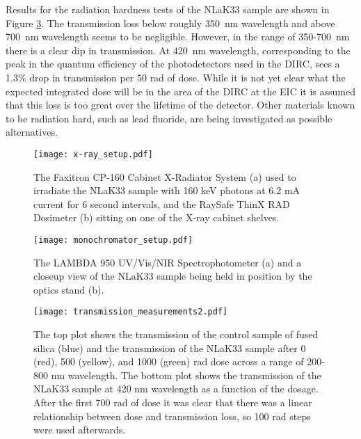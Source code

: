 Results for the radiation hardness tests of the NLaK33 sample are shown in Figure \ref{fig:transmission_measurements}. The transmission loss below roughly 350~nm wavelength and above 700~nm wavelength seems to be negligible. However, in the range of 350-700~nm there is a clear dip in transmission. At 420~nm wavelength, corresponding to the peak in the quantum efficiency of the photodetectors used in the DIRC, sees a 1.3\% drop in transmission per 50 rad of dose. While it is not yet clear what the expected integrated dose will be in the area of the DIRC at the EIC it is assumed that this loss is too great over the lifetime of the detector. Other materials known to be radiation hard, such as lead fluoride, are being investigated as possible alternatives.

\begin{figure}[!htb]
	\centering
	\texttt{[image: x-ray\_setup.pdf]}
	\caption{The Faxitron CP-160 Cabinet X-Radiator System (a) used to irradiate the NLaK33 sample with 160 keV photons at 6.2 mA current for 6 second intervals, and the RaySafe ThinX RAD Dosimeter (b) sitting on one of the X-ray cabinet shelves.}
	\label{fig:x-ray_setup}
\end{figure}


\begin{figure}[!htb]
	\centering
	\texttt{[image: monochromator\_setup.pdf]}
	\caption{The LAMBDA 950 UV/Vis/NIR Spectrophotometer (a) and a closeup view of the NLaK33 sample being held in position by the optics stand (b).}
	\label{fig:monochromator_setup}
\end{figure}

\begin{figure}[!htb]
	\centering
	\texttt{[image: transmission\_measurements2.pdf]}
	\caption{The top plot shows the transmission of the control sample of fused silica (blue) and the transmission of the NLaK33 sample after 0 (red), 500 (yellow), and 1000 (green) rad dose across a range of 200-800 nm wavelength. The bottom plot shows the transmission of the NLaK33 sample at 420 nm wavelength as a function of the dosage. After the first 700 rad of dose it was clear that there was a linear relationship between dose and transmission loss, so 100 rad steps were used afterwards.}
	\label{fig:transmission_measurements}
\end{figure}


\clearpage
